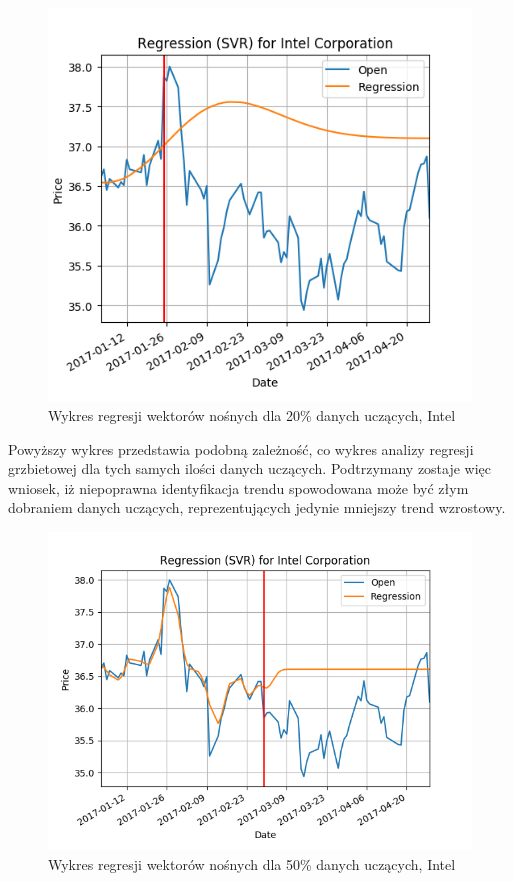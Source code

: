 \begin{figure}[h!]
\centering
\includegraphics[width=150mm]{pictures/plots/intel_svr_20.png}
\caption{Wykres regresji wektorów nośnych dla 20\% danych uczących, Intel}
\label{fig:intel_svr_20}
\end{figure}

Powyższy wykres przedstawia podobną zależność, co wykres analizy regresji grzbietowej dla tych samych ilości danych uczących.
Podtrzymany zostaje więc wniosek, iż niepoprawna identyfikacja trendu spowodowana może być złym dobraniem danych uczących, reprezentujących jedynie mniejszy trend wzrostowy.\\

\begin{figure}[h!]
\centering
\includegraphics[width=150mm]{pictures/plots/intel_svr_50.png}
\caption{Wykres regresji wektorów nośnych dla 50\% danych uczących, Intel}
\label{fig:intel_svr_50}
\end{figure}

